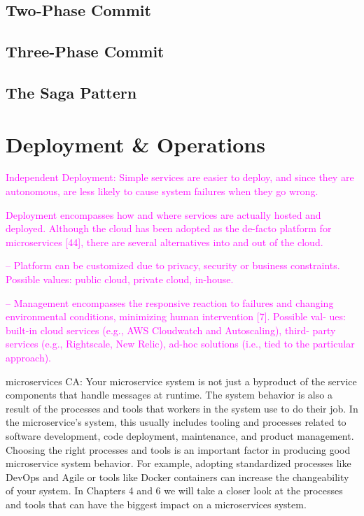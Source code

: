 \documentclass[thesis=M,english,hidelinks]{FITthesis}[2012/10/20]
\begin{document}
\subsection{Two-Phase Commit}
\subsection{Three-Phase Commit}
\subsection{The Saga Pattern}


\section{Deployment \& Operations}
\textcolor{magenta}{Independent Deployment: Simple services are easier to deploy, and since they are autonomous, are less likely to cause system failures when they go wrong.}

\textcolor{magenta}{Deployment encompasses how and where services are actually hosted and deployed. Although the cloud has been adopted as the de-facto platform for microservices [44], there are several alternatives into and out of the cloud.}

\textcolor{magenta}{– Platform can be customized due to privacy, security or business constraints. Possible values: public cloud, private cloud, in-house.}

\textcolor{magenta}{– Management encompasses the responsive reaction to failures and changing environmental conditions, minimizing human intervention [7]. Possible val- ues: built-in cloud services (e.g., AWS Cloudwatch and Autoscaling), third- party services (e.g., Rightscale, New Relic), ad-hoc solutions (i.e., tied to the particular approach).}


microservices CA:
Your microservice system is not just a byproduct of the service components that handle messages at runtime. The system behavior is also a result of the processes and tools that workers in the system use to do their job. In the microservice’s system, this usually includes tooling and processes related to software development, code deployment, maintenance, and product management.
Choosing the right processes and tools is an important factor in producing good microservice system behavior. For example, adopting standardized processes like DevOps and Agile or tools like Docker containers can increase the changeability of your system. In Chapters 4 and 6 we will take a closer look at the processes and tools that can have the biggest impact on a microservices system.
\end{document}
